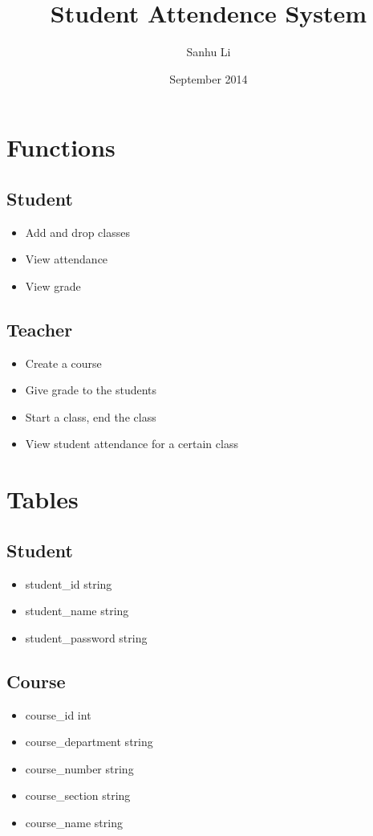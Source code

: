 \documentclass{article}
\title{Student Attendence System}
\author{Sanhu Li}
\date{September 2014}
\begin{document}
\maketitle

\section{Functions}

\subsection*{Student}
\begin{itemize}
	\item Add and drop classes
	\item View attendance
	\item View grade
\end{itemize}

\subsection*{Teacher}
\begin{itemize}
	\item Create a course
	\item Give grade to the students
	\item Start a class, end the class
	\item View student attendance for a certain class
\end{itemize}

\section{Tables}
\subsection*{Student}
\begin{itemize}
	\item student\_id string
	\item student\_name string
	\item student\_password string
\end{itemize}

\subsection*{Course} %
\begin{itemize}
	\item course\_id int
	\item course\_department string
	\item course\_number string
	\item course\_section string
	\item course\_name string
\end{itemize}
\end{document}
